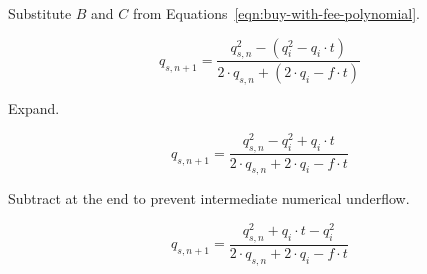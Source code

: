 Substitute $B$ and $C$ from Equations~\ref{eqn:buy-with-fee-polynomial}.

\begin{equation*}
	q_{s, n + 1} = \frac{q_{s, n}^2 - (q_i^2 - q_i \cdot t)}
	{2 \cdot q_{s, n} + (2 \cdot q_i - f \cdot t)}
\end{equation*}

Expand.

\begin{equation*}
	q_{s, n + 1} =
	\frac{q_{s, n}^2 - q_i^2 + q_i \cdot t}{2 \cdot q_{s, n} + 2 \cdot q_i - f \cdot t}
\end{equation*}

Subtract at the end to prevent intermediate numerical underflow.

\begin{equation*}
	q_{s, n + 1} =
	\frac{q_{s, n}^2 + q_i \cdot t - q_i^2}{2 \cdot q_{s, n} + 2 \cdot q_i - f \cdot t}
\end{equation*}
